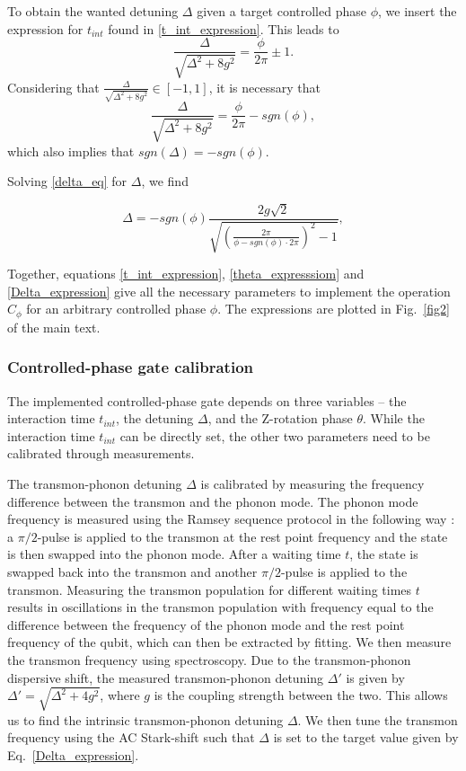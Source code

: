 \documentclass[12pt]{article}
\begin{document}
To obtain the wanted detuning $\Delta$ given a target controlled phase $\phi$, we insert the expression for $t_{int}$ found in \ref{t_int_expression}. This leads to
\begin{equation}
\frac{\Delta}{\sqrt{\Delta^2+8g^2}} = \frac{\phi}{2\pi} \pm 1.
\end{equation}
Considering that $\frac{\Delta}{\sqrt{\Delta^2+8g^2}} \in [-1,1]$, it is necessary that
\begin{equation}
\label{delta_eq}
\frac{\Delta}{\sqrt{\Delta^2+8g^2}} = \frac{\phi}{2\pi} - sgn(\phi),
\end{equation}
which also implies that $sgn(\Delta) = -sgn(\phi)$.

Solving \ref{delta_eq} for $\Delta$, we find

\begin{equation}
\label{Delta_expression}
\Delta = -sgn(\phi) \frac{2g\sqrt{2}}{\sqrt{(\frac{2\pi}{\phi- sgn(\phi)\cdot2\pi})^2-1}},
\end{equation}

Together, equations \ref{t_int_expression}, \ref{theta_expresssiom} and \ref{Delta_expression} give all the necessary parameters to implement the operation $C_{\phi}$ for an arbitrary controlled phase $\phi$. The expressions are plotted in Fig.~\ref{fig2} of the main text.


\subsubsection{Controlled-phase gate calibration}
The implemented controlled-phase gate depends on three variables -- the interaction time $t_{int}$, the detuning $\Delta$, and the Z-rotation phase $\theta$. While the interaction time $t_{int}$ can be directly set, the other two parameters need to be calibrated through measurements.

The transmon-phonon detuning $\Delta$ is calibrated by measuring the frequency difference between the transmon and the phonon mode. The phonon mode frequency is measured using the Ramsey sequence protocol in the following way \cite{chu2017quantum}: a $\pi/2$-pulse is applied to the transmon at the rest point frequency and the state is then swapped into the phonon mode. After a waiting time $t$, the state is swapped back into the transmon and another $\pi/2$-pulse is applied to the transmon. Measuring the transmon population for different waiting times $t$ results in oscillations in the transmon population with frequency equal to the difference between the frequency of the phonon mode and the rest point frequency of the qubit, which can then be extracted by fitting. We then measure the transmon frequency using spectroscopy. Due to the transmon-phonon dispersive shift, the measured transmon-phonon detuning $\Delta'$ is given by $\Delta' = \sqrt{\Delta^2+4g^2}$, where $g$ is the coupling strength between the two. This allows us to find the intrinsic transmon-phonon detuning $\Delta$. We then tune the transmon frequency using the AC Stark-shift such that $\Delta$ is set to the target value given by Eq.~\ref{Delta_expression}.
\end{document}
